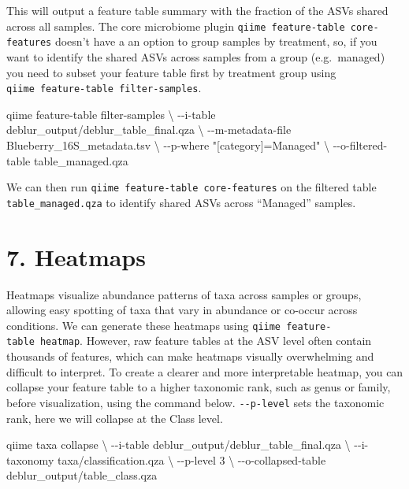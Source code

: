 \documentclass[
]{book}
\newenvironment{Shaded}{\begin{snugshade}}{\end{snugshade}}
\newcommand{\AttributeTok}[1]{\textcolor[rgb]{0.13,0.29,0.53}{#1}}
\newcommand{\DataTypeTok}[1]{\textcolor[rgb]{0.13,0.29,0.53}{#1}}
\newcommand{\ExtensionTok}[1]{#1}
\newcommand{\NormalTok}[1]{#1}
\newcommand{\StringTok}[1]{\textcolor[rgb]{0.31,0.60,0.02}{#1}}
\begin{document}
This will output a feature table summary with the fraction of the ASVs shared across all samples. The core microbiome plugin \texttt{qiime\ feature-table\ core-features} doesn't have a an option to group samples by treatment, so, if you want to identify the shared ASVs across samples from a group (e.g.~managed) you need to subset your feature table first by treatment group using \texttt{qiime\ feature-table\ filter-samples}.

\begin{Shaded}
\begin{Highlighting}[]
\ExtensionTok{qiime}\NormalTok{ feature{-}table filter{-}samples }\DataTypeTok{\textbackslash{}}
  \AttributeTok{{-}{-}i{-}table}\NormalTok{ deblur\_output/deblur\_table\_final.qza }\DataTypeTok{\textbackslash{}}
  \AttributeTok{{-}{-}m{-}metadata{-}file}\NormalTok{ Blueberry\_16S\_metadata.tsv }\DataTypeTok{\textbackslash{}}
  \AttributeTok{{-}{-}p{-}where} \StringTok{"[category]=\textquotesingle{}Managed\textquotesingle{}"} \DataTypeTok{\textbackslash{}}
  \AttributeTok{{-}{-}o{-}filtered{-}table}\NormalTok{ table\_managed.qza}
\end{Highlighting}
\end{Shaded}

We can then run \texttt{qiime\ feature-table\ core-features} on the filtered table \texttt{table\_managed.qza} to identify shared ASVs across ``Managed'' samples.

\section{7. Heatmaps}\label{heatmaps}

Heatmaps visualize abundance patterns of taxa across samples or groups, allowing easy spotting of taxa that vary in abundance or co-occur across conditions. We can generate these heatmaps using \texttt{qiime\ feature-table\ heatmap}. However, raw feature tables at the ASV level often contain thousands of features, which can make heatmaps visually overwhelming and difficult to interpret. To create a clearer and more interpretable heatmap, you can collapse your feature table to a higher taxonomic rank, such as genus or family, before visualization, using the command below. \texttt{-\/-p-level} sets the taxonomic rank, here we will collapse at the Class level.

\begin{Shaded}
\begin{Highlighting}[]

\ExtensionTok{qiime}\NormalTok{ taxa collapse }\DataTypeTok{\textbackslash{}}
  \AttributeTok{{-}{-}i{-}table}\NormalTok{ deblur\_output/deblur\_table\_final.qza }\DataTypeTok{\textbackslash{}}
  \AttributeTok{{-}{-}i{-}taxonomy}\NormalTok{ taxa/classification.qza }\DataTypeTok{\textbackslash{}}
  \AttributeTok{{-}{-}p{-}level}\NormalTok{ 3 }\DataTypeTok{\textbackslash{}}
  \AttributeTok{{-}{-}o{-}collapsed{-}table}\NormalTok{ deblur\_output/table\_class.qza}
\end{Highlighting}
\end{Shaded}
\end{document}
